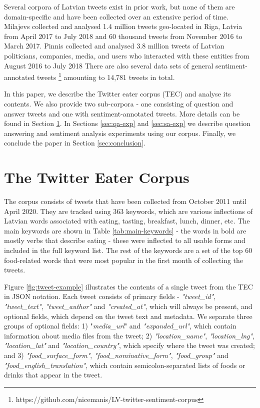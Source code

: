 \documentclass{IOS-Book-Article}
\begin{document}
Several corpora of Latvian tweets exist in prior work, but none of them are domain-specific and have been collected over an extensive period of time.
Milajevs \cite{milajevs2018language} collected and analysed 1.4 million tweets geo-located in Riga, Latvia from April 2017 to July 2018 and 60 thousand tweets \cite{milajevs-2017-toward} from November 2016 to March 2017. Pinnis \cite{pinnis2018latvian} collected and analysed 3.8 million tweets of Latvian politicians, companies, media, and users who interacted with these entities from August 2016 to July 2018 There are also several data sets of general sentiment-annotated tweets \cite{peisenieksuses,viksna2018sentiment,pinnis2018latvian}\footnote{https://github.com/nicemanis/LV-twitter-sentiment-corpus} amounting to 14,781 tweets in total. 

In this paper, we describe the Twitter eater corpus (TEC) and analyse its contents. We also provide two sub-corpora - one consisting of question and answer tweets and one with sentiment-annotated tweets. More details can be found in Section \ref{sec:corpus}. In Sections \ref{sec:qa-exp} and \ref{sec:sa-exp} we describe question answering and sentiment analysis experiments using our corpus. Finally, we conclude the paper in Section \ref{sec:conclusion}. 

\section{The Twitter Eater Corpus}
\label{sec:corpus}

The corpus consists of tweets that have been collected from October 2011 \cite{rikters2012universalas} until April 2020. They are tracked using 363 keywords, which are various inflections of Latvian words associated with eating, tasting, breakfast, lunch, dinner, etc. The main keywords are shown in Table \ref{tab:main-keywords} - the words in bold are mostly verbs that describe eating - these were inflected to all usable forms and included in the full keyword list. The rest of the keywords are a set of the top 60 food-related words that were most popular in the first month of collecting the tweets.

Figure \ref{fig:tweet-example} illustrates the contents of a single tweet from the TEC in JSON notation. Each tweet consists of primary fields - \textit{"tweet\_id"}, \textit{"tweet\_text"}, \textit{"tweet\_author"} and \textit{"created\_at"}, which will always be present, and optional fields, which depend on the tweet text and metadata. We separate three groups of optional fields: 1) "\textit{media\_url}" and \textit{"expanded\_url"}, which contain information about media files from the tweet; 2) \textit{"location\_name"}, \textit{"location\_lng"}, \textit{"location\_lat"} and \textit{"location\_country"}, which specify where the tweet was created; and 3) \textit{"food\_surface\_form"}, \textit{"food\_nominative\_form"}, \textit{"food\_group"} and \textit{"food\_english\_translation"}, which contain semicolon-separated lists of foods or drinks that appear in the tweet.
\end{document}
